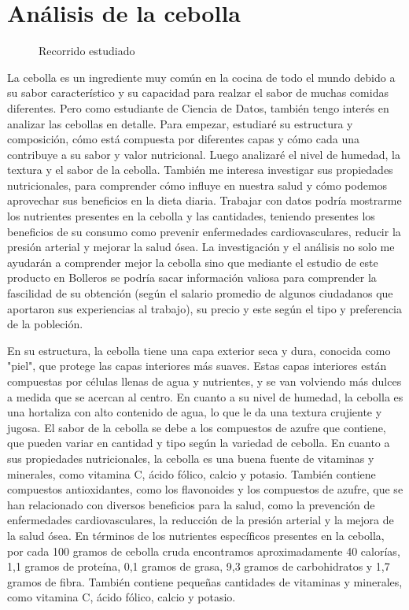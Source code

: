 \documentclass[]{article}
\begin{document}
\section{Análisis de la cebolla}
 \begin{figure}[h]
	\caption{Recorrido estudiado}
	\label{fig:logo}
\end{figure}
La cebolla es un ingrediente muy común en la cocina de todo el mundo debido a su sabor característico y su capacidad para realzar el sabor de muchas comidas diferentes. Pero como estudiante de Ciencia de Datos, también tengo interés en analizar las cebollas en detalle. Para empezar, estudiaré su estructura y composición, cómo está compuesta por diferentes capas y cómo cada una contribuye a su sabor y valor nutricional. Luego analizaré el nivel de humedad, la textura y el sabor de la cebolla. También me interesa investigar sus propiedades nutricionales, para comprender cómo influye en nuestra salud y cómo podemos aprovechar sus beneficios en la dieta diaria. Trabajar con datos podría mostrarme los nutrientes presentes en la cebolla y las cantidades, teniendo presentes los beneficios de su consumo como prevenir enfermedades cardiovasculares, reducir la presión arterial y mejorar la salud ósea. La investigación y el análisis no solo me ayudarán a comprender mejor la cebolla sino que mediante el estudio de este producto en Bolleros se podría sacar información valiosa para comprender la fascilidad de su obtención (según el salario promedio de algunos ciudadanos que aportaron sus experiencias al trabajo), su precio y este según el tipo y preferencia de la pobleción.  

En su estructura, la cebolla tiene una capa exterior seca y dura, conocida como "piel", que protege las capas interiores más suaves. Estas capas interiores están compuestas por células llenas de agua y nutrientes, y se van volviendo más dulces a medida que se acercan al centro.
En cuanto a su nivel de humedad, la cebolla es una hortaliza con alto contenido de agua, lo que le da una textura crujiente y jugosa. El sabor de la cebolla se debe a los compuestos de azufre que contiene, que pueden variar en cantidad y tipo según la variedad de cebolla.
En cuanto a sus propiedades nutricionales, la cebolla es una buena fuente de vitaminas y minerales, como vitamina C, ácido fólico, calcio y potasio. También contiene compuestos antioxidantes, como los flavonoides y los compuestos de azufre, que se han relacionado con diversos beneficios para la salud, como la prevención de enfermedades cardiovasculares, la reducción de la presión arterial y la mejora de la salud ósea.
En términos de los nutrientes específicos presentes en la cebolla, por cada 100 gramos de cebolla cruda encontramos aproximadamente 40 calorías, 1,1 gramos de proteína, 0,1 gramos de grasa, 9,3 gramos de carbohidratos y 1,7 gramos de fibra. También contiene pequeñas cantidades de vitaminas y minerales, como vitamina C, ácido fólico, calcio y potasio.
\end{document}
